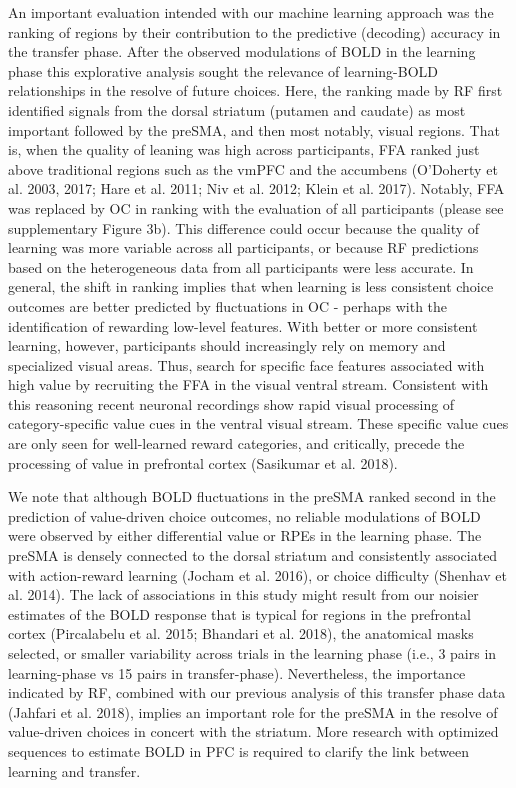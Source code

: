 \documentclass[]{article}
\begin{document}
An important evaluation intended with our machine learning approach was
the ranking of regions by their contribution to the predictive
(decoding) accuracy in the transfer phase. After the observed
modulations of BOLD in the learning phase this explorative analysis
sought the relevance of learning-BOLD relationships in the resolve of
future choices. Here, the ranking made by RF first identified signals
from the dorsal striatum (putamen and caudate) as most important
followed by the preSMA, and then most notably, visual regions. That is,
when the quality of leaning was high across participants, FFA ranked
just above traditional regions such as the vmPFC and the accumbens
(O'Doherty et al. 2003, 2017; Hare et al. 2011; Niv et al. 2012; Klein
et al. 2017). Notably, FFA was replaced by OC in ranking with the
evaluation of all participants (please see supplementary Figure 3b).
This difference could occur because the quality of learning was more
variable across all participants, or because RF predictions based on the
heterogeneous data from all participants were less accurate. In general,
the shift in ranking implies that when learning is less consistent
choice outcomes are better predicted by fluctuations in OC - perhaps
with the identification of rewarding low-level features. With better or
more consistent learning, however, participants should increasingly rely
on memory and specialized visual areas. Thus, search for specific face
features associated with high value by recruiting the FFA in the visual
ventral stream. Consistent with this reasoning recent neuronal
recordings show rapid visual processing of category-specific value cues
in the ventral visual stream. These specific value cues are only seen
for well-learned reward categories, and critically, precede the
processing of value in prefrontal cortex (Sasikumar et al. 2018).

We note that although BOLD fluctuations in the preSMA ranked second in
the prediction of value-driven choice outcomes, no reliable modulations
of BOLD were observed by either differential value or RPEs in the
learning phase. The preSMA is densely connected to the dorsal striatum
and consistently associated with action-reward learning (Jocham et al.
2016), or choice difficulty (Shenhav et al. 2014). The lack of
associations in this study might result from our noisier estimates of
the BOLD response that is typical for regions in the prefrontal cortex
(Pircalabelu et al. 2015; Bhandari et al. 2018), the anatomical masks
selected, or smaller variability across trials in the learning phase
(i.e., 3 pairs in learning-phase vs 15 pairs in transfer-phase).
Nevertheless, the importance indicated by RF, combined with our previous
analysis of this transfer phase data (Jahfari et al. 2018), implies an
important role for the preSMA in the resolve of value-driven choices in
concert with the striatum. More research with optimized sequences to
estimate BOLD in PFC is required to clarify the link between learning
and transfer.
\end{document}
